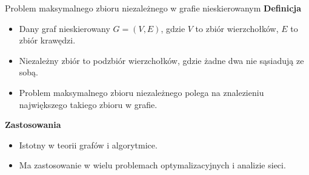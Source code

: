 \begin{frame}{Problem maksymalnego zbioru niezależnego w grafie nieskierowanym}
\textbf{Definicja}
\begin{itemize}
	\item Dany graf nieskierowany $G = (V, E)$, gdzie $V$ to zbiór wierzchołków, $E$ to zbiór krawędzi.
	\item Niezależny zbiór to podzbiór wierzchołków, gdzie żadne dwa nie sąsiadują ze sobą.
	\item Problem maksymalnego zbioru niezależnego polega na znalezieniu największego takiego zbioru w grafie.
\end{itemize}
\vspace{10pt}

\textbf{Zastosowania}
\begin{itemize}
	\item Istotny w teorii grafów i algorytmice.
	\item Ma zastosowanie w wielu problemach optymalizacyjnych i analizie sieci.
\end{itemize}
\end{frame}
	